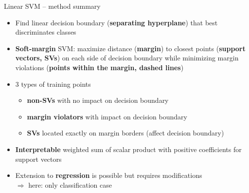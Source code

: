 \begin{vbframe}{Linear SVM -- method summary}

   
\medskip


\begin{itemize}
  \item Find linear decision boundary (\textbf{separating hyperplane}) that 
  best discriminates classes
  \item \textbf{Soft-margin} SVM: maximize distance (\textbf{margin}) to closest points (\textbf{support vectors, SVs}) on each side of decision boundary while minimizing margin violations (\textbf{points within the margin, dashed lines})
\end{itemize}

\begin{minipage}{0.7\textwidth}

\begin{itemize}
  \item 3 types of training points
  \begin{itemize}
    \item \textbf{non-SVs} with no impact on decision boundary
    \item \textbf{margin violators} with impact on decision boundary
    \item \textbf{SVs} located exactly on margin borders (affect decision boundary)
  \end{itemize}
  \item \textbf{Interpretable} weighted sum of scalar product with positive coefficients for support vectors
  \item Extension to \textbf{regression} is possible but requires modifications 
  \\ $\Rightarrow$ here: only classification case
\end{itemize}

\medskip


\end{minipage}
\end{vbframe}

